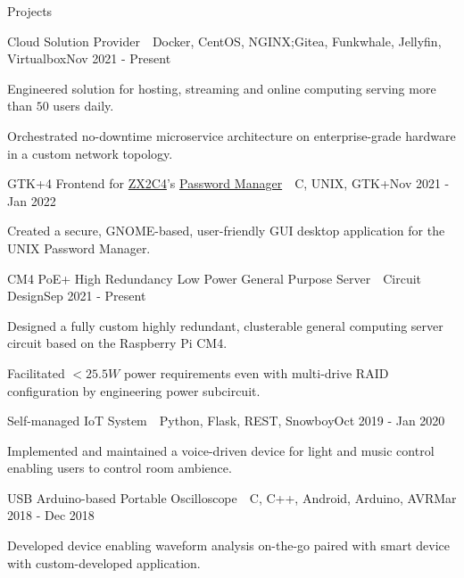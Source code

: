 \documentclass{resume}
\begin{document}
\begin{rSection}{Projects}
    \begin{rSubsection}{Cloud Solution Provider\ \mid\ \textnormal{Docker,
        CentOS, NGINX;\@ Gitea, Funkwhale, Jellyfin, Virtualbox}}{Nov 2021 - Present}{}{}
        \item Engineered solution for hosting, streaming and online computing
            serving more than $50$ users daily.
        \item Orchestrated no-downtime microservice architecture on
            enterprise-grade hardware in a custom network topology.
    \end{rSubsection}

    \begin{rSubsection}{GTK+4 Frontend for \href{zx2c4.com}{ZX2C4}'s
        \href{https://www.passwordstore.org/}{Password Manager}\ \mid\
        \textnormal{C, UNIX, GTK+}}{Nov 2021 - Jan 2022}{}{}
        \item Created a secure, GNOME-based, user-friendly GUI desktop
            application for the UNIX Password Manager.
    \end{rSubsection}

    \begin{rSubsection}{CM4 PoE+ High Redundancy Low Power General Purpose
        Server\ \mid\ \textnormal{Circuit Design}}{Sep 2021 - Present}{}{}
        \item Designed a fully custom highly redundant, clusterable general
            computing server circuit based on the Raspberry Pi CM4.
        \item Facilitated $<25.5\si{W}$ power requirements even with
            multi-drive RAID configuration by engineering power subcircuit.
    \end{rSubsection}

    \begin{rSubsection}{Self-managed IoT System\ \mid\ \textnormal{Python,
        Flask, REST, Snowboy}}{Oct 2019 - Jan 2020}{}{}
        \item Implemented and maintained a voice-driven device for light and
            music control enabling users to control room ambience.
    \end{rSubsection}

    \begin{rSubsection}{USB Arduino-based Portable Oscilloscope\ \mid\
        \textnormal{C, C++, Android, Arduino, AVR}}{Mar 2018 - Dec 2018}{}{}
        \item Developed device enabling waveform analysis on-the-go paired
            with smart device with custom-developed application.
    \end{rSubsection}
\end{rSection}
\end{document}
